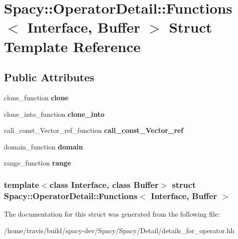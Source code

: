 \hypertarget{structSpacy_1_1OperatorDetail_1_1Functions}{\section{\-Spacy\-:\-:\-Operator\-Detail\-:\-:\-Functions$<$ \-Interface, \-Buffer $>$ \-Struct \-Template \-Reference}
\label{structSpacy_1_1OperatorDetail_1_1Functions}
}
\subsection*{\-Public \-Attributes}
\begin{DoxyCompactItemize}
\item 
\hypertarget{structSpacy_1_1OperatorDetail_1_1Functions_adf6117b3e947e89991c6c987c5e56358}{clone\-\_\-function {\bfseries clone}}\label{structSpacy_1_1OperatorDetail_1_1Functions_adf6117b3e947e89991c6c987c5e56358}

\item 
\hypertarget{structSpacy_1_1OperatorDetail_1_1Functions_a34bedb019f9833d77b5b72ceac09dc4a}{clone\-\_\-into\-\_\-function {\bfseries clone\-\_\-into}}\label{structSpacy_1_1OperatorDetail_1_1Functions_a34bedb019f9833d77b5b72ceac09dc4a}

\item 
\hypertarget{structSpacy_1_1OperatorDetail_1_1Functions_a2742a508c35c8a5f842b26a9f12c4438}{call\-\_\-const\-\_\-\-Vector\-\_\-ref\-\_\-function {\bfseries call\-\_\-const\-\_\-\-Vector\-\_\-ref}}\label{structSpacy_1_1OperatorDetail_1_1Functions_a2742a508c35c8a5f842b26a9f12c4438}

\item 
\hypertarget{structSpacy_1_1OperatorDetail_1_1Functions_aad28a247b9bc1369c330cd06f93dfdd3}{domain\-\_\-function {\bfseries domain}}\label{structSpacy_1_1OperatorDetail_1_1Functions_aad28a247b9bc1369c330cd06f93dfdd3}

\item 
\hypertarget{structSpacy_1_1OperatorDetail_1_1Functions_abad91a1ad9b07d2afa4bec0b6184c64b}{range\-\_\-function {\bfseries range}}\label{structSpacy_1_1OperatorDetail_1_1Functions_abad91a1ad9b07d2afa4bec0b6184c64b}

\end{DoxyCompactItemize}
\subsubsection*{template$<$class \-Interface, class \-Buffer$>$ struct Spacy\-::\-Operator\-Detail\-::\-Functions$<$ Interface, Buffer $>$}



\-The documentation for this struct was generated from the following file\-:\begin{DoxyCompactItemize}
\item 
/home/travis/build/spacy-\/dev/\-Spacy/\-Spacy/\-Detail/details\-\_\-for\-\_\-operator.\-hh\end{DoxyCompactItemize}
